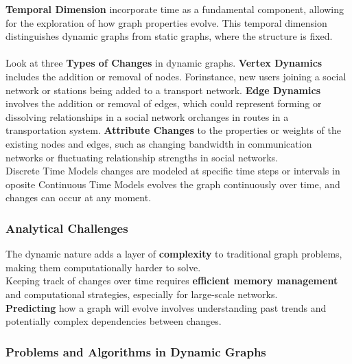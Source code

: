\documentclass[12pt]{article}
\begin{document}
    \textbf{Temporal Dimension} incorporate time as a fundamental component,
    allowing for the exploration of how graph properties evolve. This temporal
    dimension distinguishes dynamic graphs from static graphs, where the
    structure is fixed.\\
    \\
    Look at three \textbf{Types of Changes} in dynamic graphs. \textbf{Vertex Dynamics}
    includes the addition or removal of nodes. Forinstance, new users joining a
    social network or stations being added to a transport network.
    \textbf{Edge Dynamics} involves the addition or removal of edges, which could
    represent forming or dissolving relationships in a social network orchanges in
    routes in a transportation system. \textbf{Attribute Changes} to the properties
    or weights of the existing nodes and edges, such as changing bandwidth in
    communication networks or fluctuating relationship strengths in social networks.\\
    Discrete Time Models changes are modeled at specific time steps or intervals in oposite
    Continuous Time Models evolves the graph continuously over time, and changes can
    occur at any moment.

    \subsubsection{Analytical Challenges}

    The dynamic nature adds a layer of \textbf{complexity} to traditional graph
    problems, making them computationally harder to solve.\\
    Keeping track of changes over time requires \textbf{efficient memory management}
    and computational strategies, especially for large-scale networks.\\
    \textbf{Predicting} how a graph will evolve involves understanding past trends
    and potentially complex dependencies between changes.

    \subsubsection{Problems and Algorithms in Dynamic Graphs}
\end{document}
